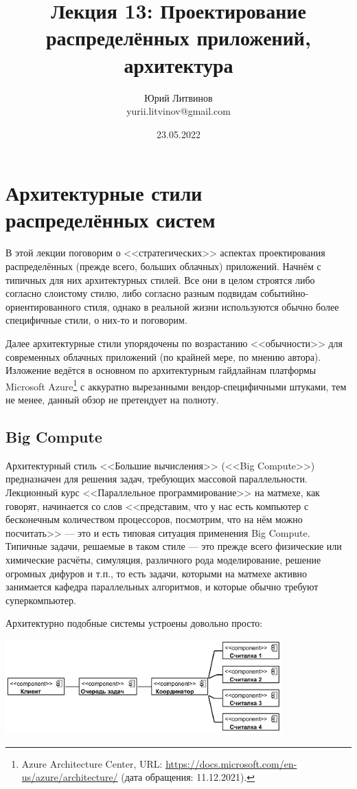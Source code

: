 \documentclass[a5paper]{article}
\title{Лекция 13: Проектирование распределённых приложений, архитектура}
\author{Юрий Литвинов\\\small{yurii.litvinov@gmail.com}}
\date{23.05.2022}
\begin{document}
\maketitle
\thispagestyle{empty}

\section{Архитектурные стили распределённых систем}

В этой лекции поговорим о <<стратегических>> аспектах проектирования распределённых (прежде всего, больших облачных) приложений. Начнём с типичных для них архитектурных стилей. Все они в целом строятся либо согласно слоистому стилю, либо согласно разным подвидам событийно-ориентированного стиля, однако в реальной жизни используются обычно более специфичные стили, о них-то и поговорим.

Далее архитектурные стили упорядочены по возрастанию <<обычности>> для современных облачных приложений (по крайней мере, по мнению автора). Изложение ведётся в основном по архитектурным гайдлайнам платформы Microsoft Azure\footnote{Azure Architecture Center, URL: \url{https://docs.microsoft.com/en-us/azure/architecture/} (дата обращения: 11.12.2021).} с аккуратно вырезанными вендор-специфичными штуками, тем не менее, данный обзор не претендует на полноту.

\subsection{Big Compute}

Архитектурный стиль <<Большие вычисления>> (<<Big Compute>>) предназначен для решения задач, требующих массовой параллельности. Лекционный курс <<Параллельное программирование>> на матмехе, как говорят, начинается со слов <<представим, что у нас есть компьютер с бесконечным количеством процессоров, посмотрим, что на нём можно посчитать>> --- это и есть типовая ситуация применения Big Compute. Типичные задачи, решаемые в таком стиле --- это прежде всего физические или химические расчёты, симуляция, различного рода моделирование, решение огромных дифуров и т.п., то есть задачи, которыми на матмехе активно занимается кафедра параллельных алгоритмов, и которые обычно требуют суперкомпьютер. 

Архитектурно подобные системы устроены довольно просто:

\begin{center}
    \includegraphics[width=0.8\textwidth]{bigCompute.png}
\end{center}
\end{document}
